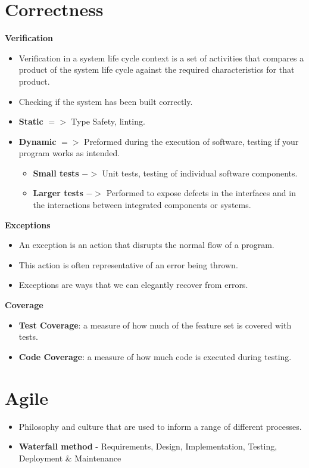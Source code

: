 \documentclass{article}
\begin{document}

\section{Correctness}
\textbf{Verification}
\begin{itemize}
    \renewcommand\labelitemi{--}
    \item Verification in a system life cycle context is a set of activities that compares a product of the system life cycle against the required characteristics for that product.
    \item Checking if the system has been built correctly.
    \item \textbf{Static} $=>$ Type Safety, linting.
    \item \textbf{Dynamic} $=>$ Preformed during the execution of software, testing if your program works as intended.
    \begin{itemize}
        \item \textbf{Small tests} $->$ Unit tests, testing of individual software components.
        \item \textbf{Larger tests} $->$ Performed to expose defects in the interfaces and in the interactions between integrated components or systems.
    \end{itemize}
\end{itemize}
\textbf{Exceptions}
    \begin{itemize}
        \renewcommand\labelitemi{--}
        \item An exception is an action that disrupts the normal flow of a program.
        \item This action is often representative of an error being thrown.
        \item  Exceptions are ways that we can elegantly recover from errors.
    \end{itemize}
\textbf{Coverage}
    \begin{itemize}
        \renewcommand\labelitemi{--}
        \item \textbf{Test Coverage}: a measure of how much of the feature set is covered with tests. 
        \item \textbf{Code Coverage}: a measure of how much code is executed during testing.
    \end{itemize}

\section{Agile}
    \begin{itemize}
        \renewcommand\labelitemi{--}
        \item Philosophy and culture that are used to inform a range of different processes. 
        \item \textbf{Waterfall method} - Requirements, Design, Implementation, Testing, Deployment \& Maintenance    
    \end{itemize}
\end{document}
